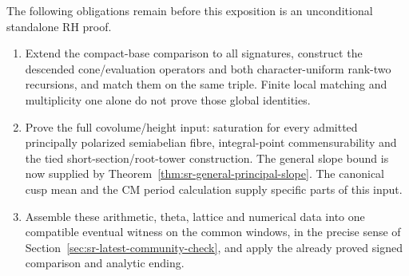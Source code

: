 The following obligations remain before this exposition is an
unconditional standalone RH proof.
\begin{enumerate}
\item Extend the compact-base comparison to all signatures, construct
the descended cone/evaluation operators and both character-uniform rank-two
recursions, and match them on the same triple.
Finite local matching and multiplicity one alone do not prove
those global identities.
\item Prove the full covolume/height input:
saturation for every admitted principally polarized semiabelian
fibre, integral-point commensurability and the tied
short-section/root-tower construction.
The general slope bound is now supplied by
Theorem~\ref{thm:sr-general-principal-slope}.
The canonical cusp mean and the CM period calculation supply
specific parts of this input.
\item Assemble these arithmetic, theta, lattice and numerical
data into one compatible eventual witness on the common windows,
in the precise sense of
Section~\ref{sec:sr-latest-community-check}, and apply the already
proved signed comparison and analytic ending.
\end{enumerate}
